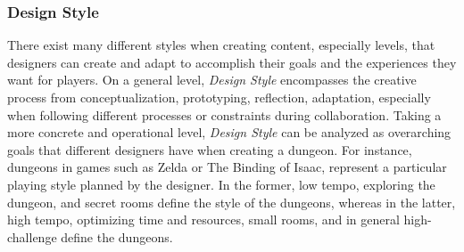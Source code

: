 \subsubsection{Design Style} \label{sec:designStyle}




There exist many different styles when creating content, especially levels, that designers can create and adapt to accomplish their goals and the experiences they want for players. On a general level, \emph{Design Style} encompasses the creative process from conceptualization, prototyping, reflection, adaptation, especially when following different processes or constraints during collaboration. Taking a more concrete and operational level, \emph{Design Style} can be analyzed as overarching goals that different designers have when creating a dungeon. For instance, dungeons in games such as Zelda or The Binding of Isaac, represent a particular playing style planned by the designer. In the former, low tempo, exploring the dungeon, and secret rooms define the style of the dungeons, whereas in the latter, high tempo, optimizing time and resources, small rooms, and in general high-challenge define the dungeons. 

